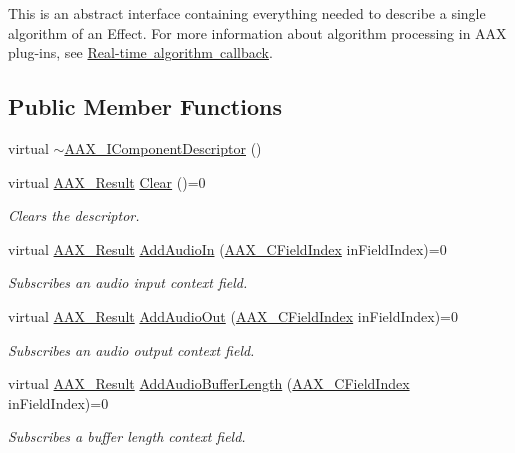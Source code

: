 This is an abstract interface containing everything needed to describe a single algorithm of an Effect. For more information about algorithm processing in A\+AX plug-\/ins, see \mbox{\hyperlink{a00797}{Real-\/time algorithm callback}}. \subsection*{Public Member Functions}
\begin{DoxyCompactItemize}
\item 
virtual \mbox{\hyperlink{a01781_a15a049b75d57c81d6201c18c6800a6da}{$\sim$\+A\+A\+X\+\_\+\+I\+Component\+Descriptor}} ()
\item 
virtual \mbox{\hyperlink{a00392_a4d8f69a697df7f70c3a8e9b8ee130d2f}{A\+A\+X\+\_\+\+Result}} \mbox{\hyperlink{a01781_a0ba6941428a6e272f72a6fadb474394f}{Clear}} ()=0
\begin{DoxyCompactList}\small\item\em Clears the descriptor. \end{DoxyCompactList}\item 
virtual \mbox{\hyperlink{a00392_a4d8f69a697df7f70c3a8e9b8ee130d2f}{A\+A\+X\+\_\+\+Result}} \mbox{\hyperlink{a01781_a5fad32eff268756c9b4309431321f9b3}{Add\+Audio\+In}} (\mbox{\hyperlink{a00392_ae807f8986143820cfb5d6da32165c9c7}{A\+A\+X\+\_\+\+C\+Field\+Index}} in\+Field\+Index)=0
\begin{DoxyCompactList}\small\item\em Subscribes an audio input context field. \end{DoxyCompactList}\item 
virtual \mbox{\hyperlink{a00392_a4d8f69a697df7f70c3a8e9b8ee130d2f}{A\+A\+X\+\_\+\+Result}} \mbox{\hyperlink{a01781_afea50c52b3c2e68eef2857b75859a954}{Add\+Audio\+Out}} (\mbox{\hyperlink{a00392_ae807f8986143820cfb5d6da32165c9c7}{A\+A\+X\+\_\+\+C\+Field\+Index}} in\+Field\+Index)=0
\begin{DoxyCompactList}\small\item\em Subscribes an audio output context field. \end{DoxyCompactList}\item 
virtual \mbox{\hyperlink{a00392_a4d8f69a697df7f70c3a8e9b8ee130d2f}{A\+A\+X\+\_\+\+Result}} \mbox{\hyperlink{a01781_a55d6cdb4a9c860c9ed4cb685e346f0dc}{Add\+Audio\+Buffer\+Length}} (\mbox{\hyperlink{a00392_ae807f8986143820cfb5d6da32165c9c7}{A\+A\+X\+\_\+\+C\+Field\+Index}} in\+Field\+Index)=0
\begin{DoxyCompactList}\small\item\em Subscribes a buffer length context field. \end{DoxyCompactList}\item 

\end{DoxyCompactItemize}
